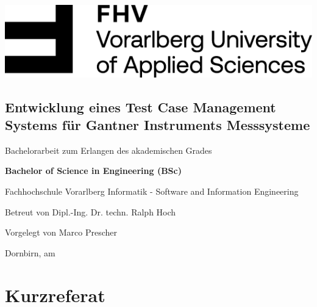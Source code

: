 \documentclass[a4paper, fontsize=11pt, parskip=half, twoside, headings=openright]{scrreprt}
\date{\displaydate{date}}
\begin{document}
	
	
	\begin{titlepage}
		\begin{flushright}
			\includegraphics[width=0.4\linewidth]{assets/FHV_FHV-Logo.png}
		\end{flushright}
		
		\vspace{1cm}	
		\begin{flushleft}
			\section*{Entwicklung eines Test Case Management Systems für Gantner Instruments Messsysteme}
			
			\vspace{1cm}
			Bachelorarbeit\newline
			zum Erlangen des akademischen Grades\newline
			
			\vspace{0.5cm}
			\textbf{Bachelor of Science in Engineering (BSc)}
			
			\vspace{1cm}
			Fachhochschule Vorarlberg\newline
			Informatik - Software and Information Engineering\newline
			
			\vspace{1cm}
			Betreut von\newline
			Dipl.-Ing. Dr. techn. Ralph Hoch
			
			\vspace{0.5cm} 
			Vorgelegt von\newline
			Marco Prescher	
			
			\vspace{0.5cm}
			Dornbirn, am 
		\end{flushleft}
	\end{titlepage}
	
	\cleardoublepage
	\section*{Kurzreferat}
\end{document}
